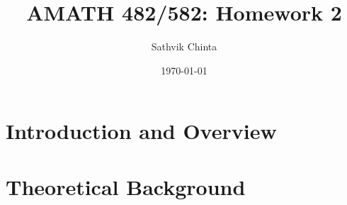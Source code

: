 \documentclass[11pt]{amsart}
\title{AMATH 482/582: Homework 2}
\author{Sathvik Chinta} %
\date{\today} %
\begin{document}
\maketitle 

\begin{abstract}
     
\end{abstract}


\section{Introduction and Overview}\label{sec:Introduction}



\section{Theoretical Background}\label{sec:theory}

\end{document}
